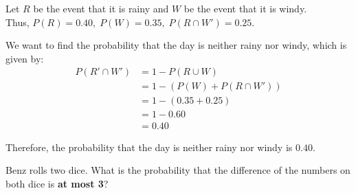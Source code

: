\documentclass[a4paper, 10pt]{article}
\begin{document}
\begin{solution}
Let \( R \) be the event that it is rainy and \( W \) be the event that it is windy. \\
Thus, \( P(R) = 0.40, \; P(W) = 0.35, \; P(R \cap W') = 0.25 \).

We want to find the probability that the day is neither rainy nor windy, which is given by:
\begin{align*}
    P(R' \cap W') &= 1 - P(R \cup W) \\
    &= 1 - (P(W) + P(R \cap W')) \\
    &= 1 - (0.35 + 0.25) \\
    &= 1 - 0.60 \\
    &= 0.40
\end{align*}

Therefore, the probability that the day is neither rainy nor windy is \( \boxed{0.40} \).
\end{solution}


\begin{problem}
Benz rolls two dice.
What is the probability that the difference of the numbers on both dice is \textbf{at most 3}?
\end{problem}
\end{document}
